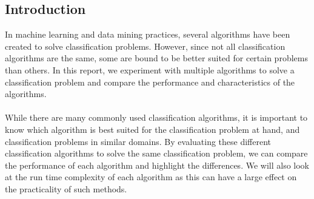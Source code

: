 \documentclass{article}
\begin{document}
\cleardoublepage
\begin{multicols}{2}
\section{Introduction}

In machine learning and data mining practices, several algorithms have been created to solve classification problems. However, since not all classification algorithms are the same, some are bound to be better suited for certain problems than others. In this report, we experiment with multiple algorithms to solve a classification problem and compare the performance and characteristics of the algorithms.
\\\\
While there are many commonly used classification algorithms, it is important to know which algorithm is best suited for the classification problem at hand, and classification problems in similar domains. By evaluating these different classification algorithms to solve the same classification problem, we can compare the performance of each algorithm and highlight the differences. We will also look at the run time complexity of each algorithm as this can have a large effect on the practicality of such methods.

\end{multicols}
\end{document}

